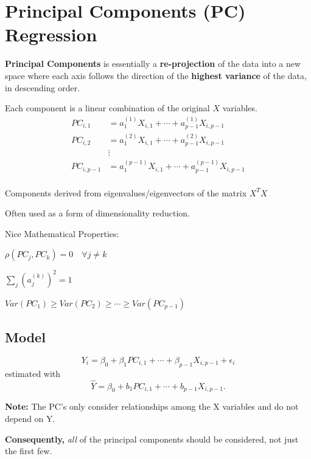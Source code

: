 \documentclass[12pt]{notes}
\begin{document}

\section{Principal Components (PC) Regression}
\textbf{Principal Components} is essentially a \textbf{re-projection} of the data into a new space where each axis follows the direction of the \textbf{highest variance} of the data, in descending order. 
\bi
\item Each component is a linear combination of the original $X$ variables. 
\begin{align*}
PC_{i, 1} &= a_1^{(1)}X_{i, 1} + \cdots + a^{(1)}_{p-1}X_{i, p-1} \\
PC_{i, 2} &= a_1^{(2)}X_{i, 1} + \cdots + a^{(2)}_{p-1}X_{i, p-1} \\
& \vdots \\
PC_{i, p-1} &= a_1^{(p-1)}X_{i, 1} + \cdots + a^{(p-1)}_{p-1}X_{i, p-1} \\
\end{align*}
\item Components derived from eigenvalues/eigenvectors of the matrix $X^TX$
\item Often used as a form of dimensionality reduction. 
\ei

Nice Mathematical Properties:
\bi
\item $\rho(PC_j, PC_k) = 0 \quad \forall j \ne k$
\item $\sum_j\left(a_j^{(k)}\right)^2 = 1$
\item $Var(PC_1) \ge Var(PC_2) \ge \cdots \ge Var(PC_{p-1})$
\ei

\subsection{Model}
$$Y_i = \beta_0 + \beta_1PC_{i, 1} + \cdots + \beta_{p-1}X_{i, p-1} + \epsilon_i$$
estimated with 
$$\hat{Y}= \beta_0 + b_1PC_{i, 1} + \cdots + b_{p-1}X_{i, p-1}.$$

\textbf{Note:} The PC's only consider relationships among the X variables and do not depend on Y. 

\nspace
\textbf{Consequently,} \textit{all} of the principal components should be considered, not just the first few. 


\begin{minipage}[l][2cm][c]{\textwidth}

\end{minipage}
\end{document}
